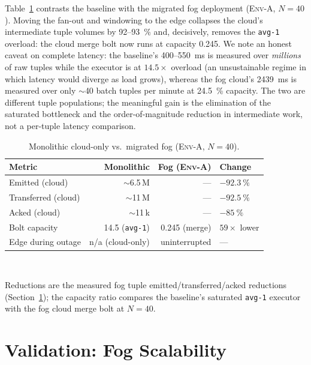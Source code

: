 \documentclass[conference]{IEEEtran}
\newcommand{\code}[1]{\texttt{#1}}
\begin{document}
Table~\ref{tab:mono-vs-fog} contrasts the baseline with the migrated fog
deployment (\textsc{Env-A}, $N=40$). Moving the fan-out and windowing to the edge
collapses the cloud's intermediate tuple volumes by \SI{92}{}--\SI{93}{\percent}
and, decisively, removes the \code{avg-1} overload: the cloud merge bolt now runs
at capacity \num{0.245}. We note an honest caveat on complete latency: the
baseline's \SI{400}{}--\SI{550}{\milli\second} is measured over \emph{millions} of
raw tuples while the executor is at $14.5\times$ overload (an unsustainable regime
in which latency would diverge as load grows), whereas the fog cloud's
\SI{2439}{\milli\second} is measured over only $\sim$40 batch tuples per minute at
\SI{24.5}{\percent} capacity. The two are different tuple populations; the
meaningful gain is the elimination of the saturated bottleneck and the
order-of-magnitude reduction in intermediate work, not a per-tuple latency
comparison.

\begin{table}[t]
\centering
\caption{Monolithic cloud-only vs.\ migrated fog (\textsc{Env-A}, $N=40$).}
\label{tab:mono-vs-fog}
\footnotesize
\setlength{\tabcolsep}{3.5pt}
\begin{tabular}{lrrl}
\toprule
Metric & Monolithic & Fog (\textsc{Env-A}) & Change \\
\midrule
Emitted (cloud)        & $\sim$6.5\,M & --- & $-\SI{92.3}{\percent}$ \\
Transferred (cloud)    & $\sim$11\,M  & --- & $-\SI{92.5}{\percent}$ \\
Acked (cloud)          & $\sim$11\,k  & --- & $-\SI{85}{\percent}$ \\
Bolt capacity          & 14.5 (\code{avg-1}) & 0.245 (merge) & $59\times$ lower \\
Edge during outage     & n/a (cloud-only) & uninterrupted & --- \\
\bottomrule
\end{tabular}
\\[2pt]
\raggedright\scriptsize Reductions are the measured fog tuple
emitted/transferred/acked reductions (Section~\ref{sec:kb1}); the capacity ratio
compares the baseline's saturated \code{avg-1} executor with the fog cloud merge
bolt at $N=40$.
\end{table}

\section{Validation: Fog Scalability}\label{sec:kb1}
\end{document}
